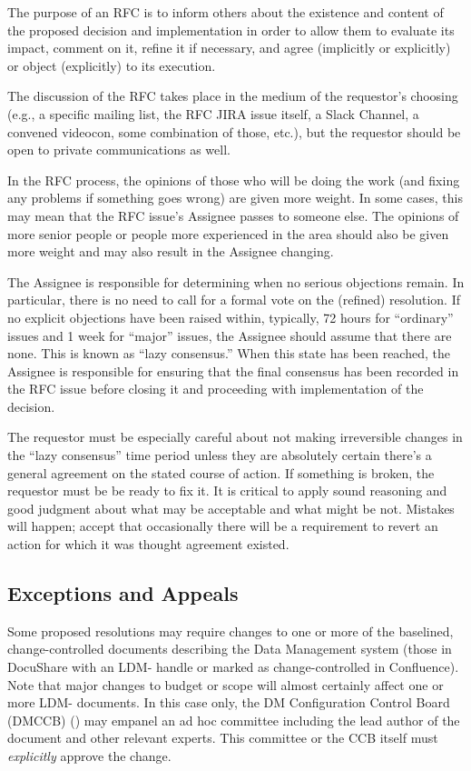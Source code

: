 The purpose of an RFC is to inform others about the existence and content of the proposed decision and implementation in order to allow them to evaluate its impact, comment on it, refine it if necessary, and agree (implicitly or explicitly) or object (explicitly) to its execution.

The discussion of the RFC takes place in the medium of the requestor's choosing (e.g., a specific mailing list, the RFC JIRA issue itself, a Slack Channel, a convened videocon, some combination of those, etc.), but the requestor should be open to private communications as well.

In the RFC process, the opinions of those who will be doing the work (and fixing any problems if something goes wrong) are given more weight. In some cases, this may mean that the RFC issue's Assignee passes to someone else. The opinions of more senior people or people more experienced in the area should also be given more weight and may also result in the Assignee changing.

The Assignee is responsible for determining when no serious objections remain.  In particular, there is no need to call for a formal vote on the (refined) resolution. If no explicit objections have been raised within, typically, 72 hours for ``ordinary'' issues and 1 week for ``major'' issues, the Assignee should assume that there are none. This is known as ``lazy consensus.'' When this state has been reached, the Assignee is responsible for ensuring that the final consensus has been recorded in the RFC issue before closing it and proceeding with implementation of the decision.

The requestor must be especially careful about not making irreversible changes in the ``lazy consensus'' time period unless they are absolutely certain there's a general agreement on the stated course of action. If something is broken, the requestor must be be ready to fix it. It is critical to apply sound reasoning and good judgment about what may be acceptable and what might be not. Mistakes will happen; accept that occasionally there will be a requirement to revert an action for which it was thought agreement existed.

\subsection{Exceptions and Appeals}
Some proposed resolutions may require changes to one or more of the baselined, change-controlled documents describing the Data Management system (those in DocuShare with an LDM- handle or marked as change-controlled in Confluence).  Note that major changes to budget or scope will almost certainly affect one or more LDM- documents.  In this case only, the DM Configuration Control Board (DMCCB) ()  may empanel an ad hoc committee including the lead author of the document and other relevant experts. This committee or the CCB itself must \emph{explicitly} approve the change.


